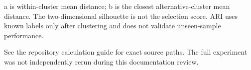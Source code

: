 \documentclass[11pt]{article}
\begin{document}
a is within-cluster mean distance; b is the closest alternative-cluster mean distance. The two-dimensional silhouette is not the selection score. ARI uses known labels only after clustering and does not validate unseen-sample performance.

See the repository calculation guide for exact source paths. The full experiment was not independently rerun during this documentation review.
\end{document}
